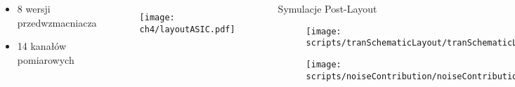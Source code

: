 \begin{frame}{}
    \begin{columns}

    \begin{block}{}
        \begin{itemize}
            \item 8 wersji przedwzmacniacza
            \item 14 kanałów pomiarowych
        \end{itemize}
    \end{block}


    \begin{figure}[H]
        \centering
        \texttt{[image: ch4/layoutASIC.pdf]} 
    \end{figure}   

    \begin{block}{
Symulacje Post-Layout
    }

    \begin{figure}[H]
        \centering
        \texttt{[image: scripts/tranSchematicLayout/tranSchematicLayout.pdf]}  
    \end{figure}
    \vspace{-5mm} %
    \begin{figure}[H]
        \centering
        \texttt{[image: scripts/noiseContribution/noiseContributionOut.pdf]}  
    \end{figure}
    \end{block}
    \end{columns}   
  
\end{frame}




